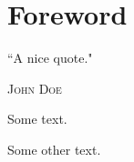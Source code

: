 \chapter*{Foreword}
\thispagestyle{empty}

\vspace{-2cm}
\vfill

\begin{center}
\begin{minipage}{15cm}
\epigraph{``A nice quote."}{\textsc{John Doe \cite{manual-identifier}}}
\vspace{-1.2cm}
Some text.

Some other text.

\end{minipage}
\end{center}

\vfill
